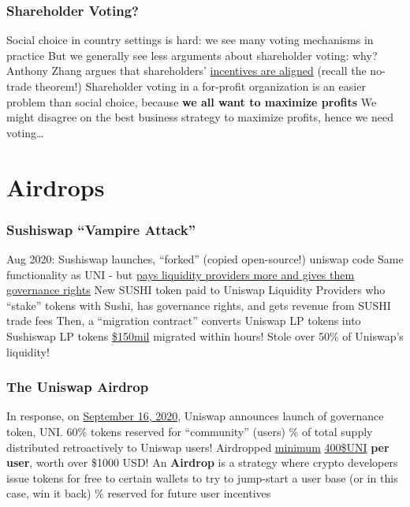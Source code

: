\documentclass[]{beamer}
\begin{document}
\begin{frame}
\frametitle{Shareholder Voting?}

\bi
\m Social choice in country settings is hard: we see many voting mechanisms in practice
\m But we generally see less arguments about shareholder voting: why? \pause
\m Anthony Zhang argues that shareholders'  \href{https://anthonyleezhang.substack.com/p/shareholder-voting-and-social-choice}{incentives are aligned} (recall the no-trade theorem!) 
\m Shareholder voting in a for-profit organization is an easier problem than social choice, because \textbf{we all want to maximize profits} \pause
\m We might disagree on the best business strategy to maximize profits, hence we need voting\ldots \pause
\ei


\end{frame}






\section{Airdrops}

\begin{frame}
\frametitle{Sushiswap ``Vampire Attack''}

\bi
{} Aug 2020: Sushiswap launches, ``forked'' (copied open-source!) uniswap code
\m Same functionality as UNI - but \href{https://www.gemini.com/cryptopedia/sushiswap-uniswap-vampire-attack}{pays liquidity providers more and gives them governance rights} 
\bi
\m New SUSHI token paid to Uniswap Liquidity Providers who ``stake'' tokens with Sushi, has governance rights, and gets revenue from SUSHI trade fees
\ei
\m Then, a ``migration contract'' converts Uniswap LP tokens into Sushiswap LP tokens
\m \href{https://finematics.com/vampire-attack-sushiswap-explained/}{\$150mil} migrated within hours! Stole over 50\% of Uniswap's liquidity!
\ei
\end{frame}


\begin{frame}
\frametitle{The Uniswap Airdrop}

\bi
\m In response, on \href{https://uniswap.org/blog/uni}{September 16, 2020}, Uniswap announces launch of governance token, UNI. 60\% tokens reserved for ``community'' (users)
\% of total supply distributed retroactively to Uniswap users!
\m Airdropped \ul{minimum} \href{https://www.coindesk.com/markets/2020/09/17/uniswap-recaptures-defi-buzz-with-uni-tokens-airdropped-debut/}{400\$UNI} \textbf{per user}, worth over \$1000 USD!
\bi 
\m An \textbf{Airdrop} is a strategy where crypto developers issue tokens for free to certain wallets to try to jump-start a user base (or in this case, win it back)
\ei 
{}\% reserved for future user incentives
\ei

\end{frame}
\end{document}
